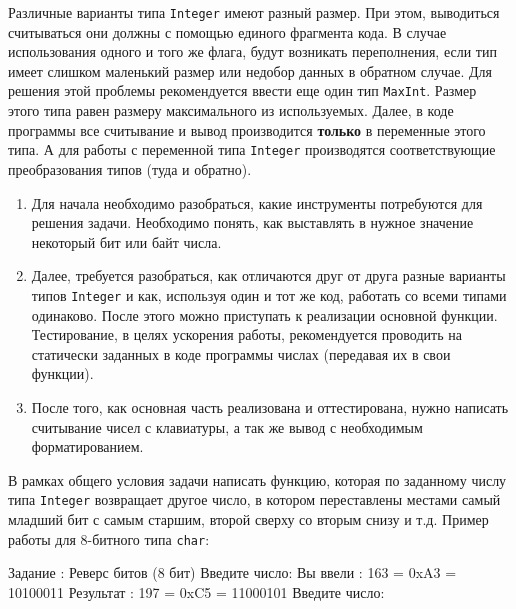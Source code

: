 Различные варианты типа \texttt{Integer} имеют разный размер. При этом, выводиться считываться они должны с помощью единого фрагмента кода. В случае использования одного и того же флага, будут возникать переполнения, если тип имеет слишком маленький размер или недобор данных в обратном случае. Для решения этой проблемы рекомендуется ввести еще один тип \texttt{MaxInt}. Размер этого типа равен размеру максимального из используемых. Далее, в коде программы все считывание и вывод производится \textbf{только} в переменные этого типа. А для работы с переменной типа \texttt{Integer} производятся соответствующие преобразования типов (туда и обратно).
\zzsectionPLAN


\begin{enumerate}
\item Для начала необходимо разобраться, какие инструменты потребуются для решения задачи. Необходимо понять, как выставлять в нужное значение некоторый бит или байт числа.
\item Далее, требуется разобраться, как отличаются друг от друга разные варианты типов \texttt{Integer} и как, используя один и тот же код, работать со всеми типами одинаково. После этого можно приступать к реализации основной функции. Тестирование, в целях ускорения работы, рекомендуется проводить на статически заданных в коде программы числах (передавая их в свои функции).
\item После того, как основная часть реализована и оттестирована, нужно написать считывание чисел с клавиатуры, а так же вывод с необходимым форматированием. 
\end{enumerate}


\zzsectionVARIATIONS


\begin{zztask}
В рамках общего условия задачи написать функцию, которая по заданному
числу типа \texttt{Integer} возвращает другое число, в котором переставлены местами
самый младший бит с самым старшим, второй сверху со вторым снизу и т.д.
Пример работы для 8-битного типа \texttt{char}:
\begin{zzoutput}
  Задание \thezztask: Реверс битов (8 бит)
  Введите число: 
  Вы ввели  :  163 = 0xA3 = 10100011
  Результат :  197 = 0xC5 = 11000101
  Введите число: \zzuser{ }
\end{zzoutput}
\end{zztask}

